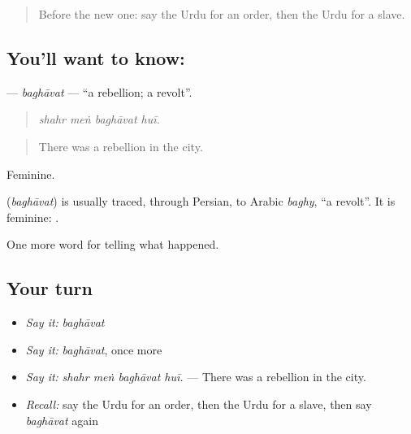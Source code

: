 \label{lesson:UR-C312-baghavat}



\begin{quote}
Before the new one: say the Urdu for an order, then the Urdu for a slave.
\end{quote}

\subsection*{You'll want to know: }
\textbf{} — \emph{baghāvat} — \textquotedblleft{}a rebellion; a revolt\textquotedblright{}.

\begin{quote}
   
\end{quote}

\begin{quote}
\emph{shahr meṅ baghāvat huī.}
\end{quote}

\begin{quote}
There was a rebellion in the city.
\end{quote}

Feminine.

\begin{cousinweb}
\textbf{} (\emph{baghāvat}) is usually traced, through Persian, to Arabic \emph{baghy}, \textquotedblleft{}a revolt\textquotedblright{}. It is feminine: \textbf{ }.
\end{cousinweb}

\begin{grammarlens}[title={What you've built}]
One more word for telling what happened.
\end{grammarlens}

\subsection*{Your turn}
\begin{itemize}
\raggedright
  \item \emph{Say it:} \emph{baghāvat}
  \item \emph{Say it:} \emph{baghāvat}, once more
  \item \emph{Say it:} \emph{shahr meṅ baghāvat huī.} — There was a rebellion in the city.
  \item \emph{Recall:} say the Urdu for an order, then the Urdu for a slave, then say \emph{baghāvat} again
\end{itemize}

